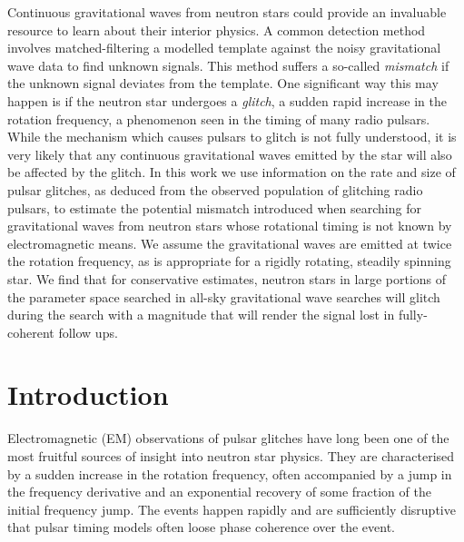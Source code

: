 \documentclass[../full_thesis/full_thesis.tex]{subfiles}
\begin{document}
Continuous gravitational waves from neutron stars could provide
an invaluable resource to learn about their interior physics. A common detection
method involves matched-filtering a modelled template against the noisy gravitational wave data to
find unknown signals.  This method suffers a so-called \emph{mismatch} if the unknown
signal deviates from the template. One significant way this may happen is if
the neutron star undergoes a \emph{glitch}, a sudden rapid increase in the
rotation frequency, a phenomenon seen in the timing of many radio pulsars.
While the mechanism which causes pulsars to glitch is not fully understood, it is very likely that
 any continuous gravitational waves emitted by the star will also be affected by the glitch.  In this work we use information on the rate and size of pulsar glitches, as deduced from the observed population of glitching radio pulsars, to estimate the potential mismatch introduced when searching for gravitational waves from neutron stars whose rotational timing is not known by electromagnetic means.
 We assume the gravitational waves are emitted at twice the rotation frequency, as is appropriate for a rigidly rotating, steadily spinning star.   We find that for conservative estimates, neutron stars in large portions of the parameter space searched in all-sky gravitational wave searches will glitch during the search with a magnitude that will render the signal lost in fully-coherent follow ups.


\section{Introduction}
\label{sec: glitches introduction}

Electromagnetic (EM) observations of pulsar glitches have long been one of the most
fruitful sources of insight into neutron star physics. They are characterised
by a sudden increase in the rotation frequency, often accompanied by a jump in
the frequency derivative and an exponential recovery of some fraction of the
initial frequency jump. The events happen
rapidly and are sufficiently disruptive that pulsar timing models often loose phase
coherence over the event.
\end{document}
